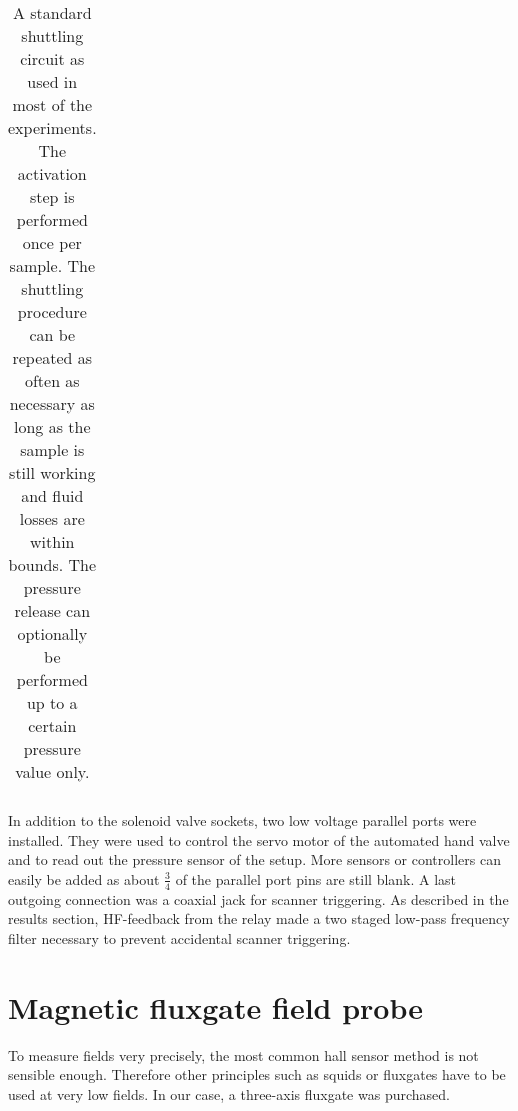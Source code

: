 \begin{table}
\begin{tabular}{| l | c | cccc | ccc | r |}
                    \hline 
                \end{tabular}
                \caption[15N hyperpolarization steps]{A standard shuttling circuit as used in most of the experiments. The activation step is performed once per sample. The shuttling procedure can be repeated as often as necessary as long as the sample is still working and fluid losses are within bounds. The pressure release can optionally be performed up to a certain pressure value only.}
                \label{table:matMeth:shuttlingCycle}
            \end{table}
            In addition to the solenoid valve sockets, two low voltage parallel ports were installed.  They were used to control the servo motor of the automated hand valve and to read out the pressure sensor of the setup. More sensors or controllers can easily be added as about $\frac{3}{4}$ of the parallel port pins are still blank.
            A last outgoing connection was a coaxial jack for scanner triggering.  As described in the results section, HF-feedback from the relay made a two staged low-pass frequency filter necessary to prevent accidental scanner triggering.
    \section{Magnetic fluxgate field probe}\label{sec:methodsfluxgate}
        To measure fields very precisely, the most common hall sensor method is not sensible enough. Therefore other principles such as squids or fluxgates have to be used at very low fields. In our case, a three-axis fluxgate was purchased.
